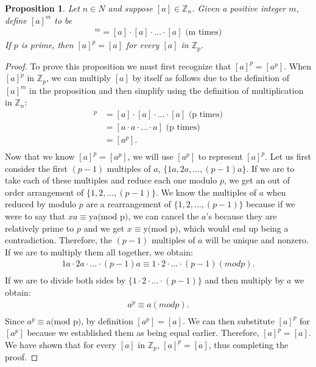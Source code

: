 \documentclass[11 pt]{article}
\newtheorem{proposition}{Proposition}
\newcommand{\newpar}{\vspace{.15in}\noindent}
\begin{document}
\newpar
\begin{proposition}
Let $n \in N$ and suppose $[a] \in \mathbb{Z}_n$. Given a positive integer $m$, define $[a]^m$ to be
\begin{align*}
[a]^m=[a]\cdot[a]\cdot . . . \cdot[a] \text{   (m times)}
\end{align*}
If $p$ is prime, then $[a]^p = [a]$ for every $[a]$ in $\mathbb{Z}_p$.
\end{proposition}
\begin{proof}
\newpar 
To prove this proposition we must first recognize that $[a]^p=[a^p]$. When $[a]^p$ in $\mathbb{Z}_p$, we can multiply $[a]$ by itself as follows due to the definition of $[a]^m$ in the proposition and then simplify using the definition of multiplication in $\mathbb{Z}_n$:
\begin{align*}
[a]^p&=[a]\cdot[a]\cdot. . .\cdot[a] \text{   (p times)} \\
&= [a\cdot a\cdot. . .\cdot a] \text{   (p times)} \\
&= [a^p]. \\
\end{align*}
\noindent
Now that we know $[a]^p=[a^p]$, we will use $[a^p]$ to represent $[a]^p$. Let us first consider the first $(p-1)$ multiples of $a$, $\{1a, 2a, . . . , (p-1)a\}$. If we are to take each of these multiples and reduce each one modulo $p$, we get an out of order arrangement of $\{1,2, . . ., (p-1)\}$. We know the multiples of $a$ when reduced by modulo $p$ are a rearrangement of $\{1,2, . . ., (p-1)\}$ because if we were to say that $xa\equiv \mbox{ya(mod p)}$, we can cancel the $a$'s because they are relatively prime to $p$ and we get $x\equiv \mbox{y(mod p)}$, which would end up being a contradiction. Therefore, the $(p-1)$ multiples of $a$ will be unique and nonzero. If we are to multiply them all together, we obtain:
\begin{align*}
1a\cdot 2a\cdot . . .\cdot (p-1)a \equiv 1\cdot 2\cdot . . .\cdot (p-1) (mod p). \\
\end{align*}
\noindent
If we are to divide both sides by $\{1\cdot 2\cdot . . . \cdot (p-1)\}$ and then multiply by $a$ we obtain:
\begin{align*}
a^p\equiv a(mod p). \\
\end{align*}
\noindent
Since $a^p\equiv \mbox{a(mod p)}$, by definition $[a^p]=[a]$. We can then substitute $[a]^p$ for $[a^p]$ because we established them as being equal earlier. Therefore, $[a]^p=[a]$. We have shown that for every $[a]$ in $\mathbb{Z}_p$, $[a]^p=[a]$, thus completing the proof.
\end{proof}
\end{document}

